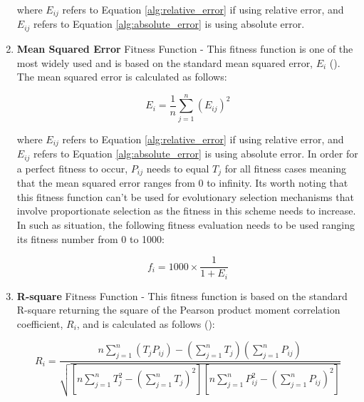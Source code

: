 \begin{enumerate}
    \noindent where $E_{ij}$ refers to Equation \ref{alg:relative_error} if using relative error, and $E_{ij}$ refers to Equation \ref{alg:absolute_error} is using absolute error.

    \item \textbf{Mean Squared Error} Fitness Function - This fitness function is one of the most widely used and is based on the standard mean squared error, \textit{$E_i$} (\cite{ferreira2006gene}). The mean squared error is calculated as follows:
    \begin{ceqn}
        \begin{equation}\label{alg:mean_square_error}
            E_i = \frac{1}{n}\sum_{j=1}^{n}(E_{ij})^2
        \end{equation}
    \end{ceqn}

    \noindent where $E_{ij}$ refers to Equation \ref{alg:relative_error} if using relative error, and $E_{ij}$ refers to Equation \ref{alg:absolute_error} is using absolute error. In order for a perfect fitness to occur, \textit{$P_{ij}$} needs to equal \textit{$T_j$} for all fitness cases meaning that the mean squared error ranges from 0 to infinity. Its worth noting that this fitness function can't be used for evolutionary selection mechanisms that involve proportionate selection as the fitness in this scheme needs to increase. In such as situation, the following fitness evaluation needs to be used ranging its fitness number from 0 to 1000:
    \begin{ceqn}
        \begin{equation}\label{alg:mean_square_error_fitness}
            f_i = 1000 \times \frac{1}{1 + E_i}
        \end{equation}
    \end{ceqn}

    \item \textbf{R-square} Fitness Function - This fitness function is based on the standard R-square returning the square of the Pearson product moment correlation coefficient, \textit{$R_i$}, and is calculated as follows (\cite{ferreira2006gene}):
    \begin{ceqn}
        \begin{equation}\label{alg:r_square}
            R_i = \frac{n\sum_{j=1}^{n}(T_jP_{ij}) - (\sum_{j=1}^{n}T_j)(\sum_{j=1}^{n}P_{ij})}{\sqrt{[n\sum_{j=1}^{n}T_j^2 - (\sum_{j=1}^{n}T_j)^2][n\sum_{j=1}^{n}P_{ij}^2 - (\sum_{j=1}^{n}P_{ij})^2]}}
        \end{equation}
    \end{ceqn}


\end{enumerate}

